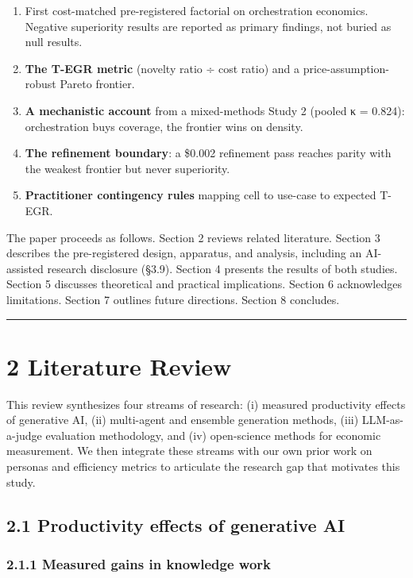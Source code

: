 \documentclass[11pt,a4paper]{article}
\begin{document}
\begin{enumerate}
\item \textit{}First cost-matched pre-registered factorial on orchestration
   economics.\textit{} Negative superiority results are reported as primary
   findings, not buried as null results.
\item \textbf{The T-EGR metric} (novelty ratio ÷ cost ratio) and a
   price-assumption-robust Pareto frontier.
\item \textbf{A mechanistic account} from a mixed-methods Study 2 (pooled κ =
   0.824): orchestration buys coverage, the frontier wins on density.
\item \textbf{The refinement boundary}: a \$0.002 refinement pass reaches parity
   with the weakest frontier but never superiority.
\item \textbf{Practitioner contingency rules} mapping cell to use-case to
   expected T-EGR.
\end{enumerate}


The paper proceeds as follows. Section 2 reviews related literature.
Section 3 describes the pre-registered design, apparatus, and analysis,
including an AI-assisted research disclosure (§3.9).
Section 4 presents the results of both studies. Section 5 discusses
theoretical and practical implications. Section 6 acknowledges
limitations. Section 7 outlines future directions. Section 8 concludes.

\hrule


\section{2 Literature Review}

This review synthesizes four streams of research: (i) measured productivity
effects of generative AI, (ii) multi-agent and ensemble generation methods,
(iii) LLM-as-a-judge evaluation methodology, and (iv) open-science methods
for economic measurement. We then integrate these streams with our own prior
work on personas and efficiency metrics to articulate the research gap that
motivates this study.

\subsection{2.1 Productivity effects of generative AI}

\subsubsection{2.1.1 Measured gains in knowledge work}
\end{document}
